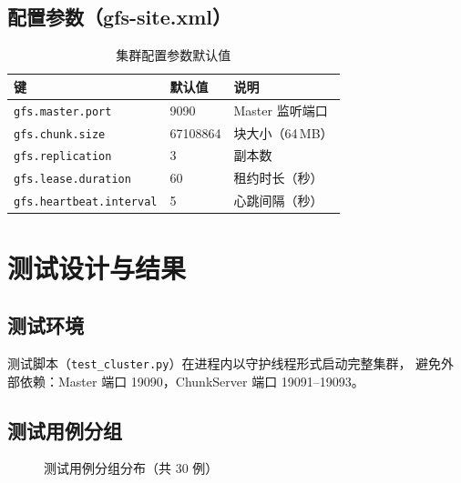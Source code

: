 \documentclass[10pt,a4paper]{article}
\begin{document}
\subsection{配置参数（gfs-site.xml）}

\begin{table}[H]
\centering
\caption{集群配置参数默认值}
\begin{tabularx}{\textwidth}{llX}
\toprule
\textbf{键} & \textbf{默认值} & \textbf{说明} \\
\midrule
\texttt{gfs.master.port}         & 9090      & Master 监听端口 \\
\texttt{gfs.chunk.size}          & 67108864  & 块大小（64\,MB）\\
\texttt{gfs.replication}         & 3         & 副本数 \\
\texttt{gfs.lease.duration}      & 60        & 租约时长（秒）\\
\texttt{gfs.heartbeat.interval}  & 5         & 心跳间隔（秒）\\
\bottomrule
\end{tabularx}
\end{table}

\section{测试设计与结果}

\subsection{测试环境}

测试脚本（\texttt{test\_cluster.py}）在进程内以守护线程形式启动完整集群，
避免外部依赖：Master 端口 19090，ChunkServer 端口 19091--19093。

\subsection{测试用例分组}

\begin{figure}[H]
\centering
{}
\caption{测试用例分组分布（共 30 例）}
\label{fig:testgroups}
\end{figure}
\end{document}
